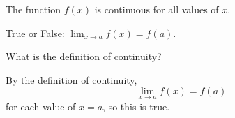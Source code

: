 \documentclass{ximera}
\author{Emma Smith Zbarsky}
\begin{document}
\begin{exercise}

The function $f(x)$ is continuous for all values of $x$.

True or False: $\lim_{x\to a}f(x) = f(a).$


\begin{hint}
What is the definition of continuity?
\end{hint}


\begin{hint}
By the definition of continuity, \[\lim_{x\to a} f(x) = f(a)\] for each
value of $x=a$, so this is true.
\end{hint}


\begin{multipleChoice}
\end{multipleChoice}

\end{exercise}
\end{document}
